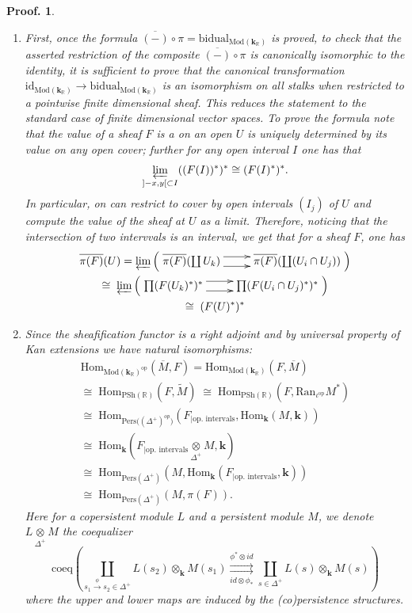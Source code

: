 \documentclass[a4paper, english, 11pt]{article}
\newcommand{\kk}[0]{\textbf{k}}
\newcommand{\Mod}[0]{\text{Mod}}
\newcommand{\Pe}{\text{Pers}}
\newcommand{\0}{\vec{0}}
\newcommand{\R}[0]{\mathbb{R}}
\newcommand{\op}[0]{\text{op}}
\newcommand{\Hom}[0]{\text{Hom}}
\newtheorem*{pf}{Proof.} }
\begin{document}
\begin{pf}
\begin{enumerate}
    \item First, once the formula  $\overline{(-)}\circ \pi =\text{bidual}_{\Mod(\kk_\R)}$ is proved, to check  that the asserted restriction of the composite $\overline{(-)}\circ \pi $ is canonically isomorphic to the identity, it is sufficient  to prove that the canonical transformation $\text{id}_{\Mod(\kk_\R)} \to \text{bidual}_{\Mod(\kk_\R)}$ is an isomorphism on all stalks when restricted to a pointwise finite dimensional sheaf. This reduces the statement to the standard case of finite dimensional vector spaces.  To prove the formula note that the value of a sheaf  $F$ is a  on an open $U$ is uniquely determined by its value on any open cover; further for any open interval $I$ one has that $$\varprojlim_{]-x,y[\subset I} ((F(I))^*)^* \cong (F(I)^*)^*.$$ In particular, on can restrict to cover by open intervals $(I_j)$ of $U$ and compute the value of the sheaf at $U$ as a limit.
   Therefore, noticing that the intersection of two intervvals is an interval, we get that for a sheaf $F$, one has 
   \begin{multline*}\overline{\pi(F)}(U) = \varprojlim \Big(\xymatrix{\overline{\pi(F)}(\coprod U_k) \ar@<1ex>[r] \ar@<-1ex>[r] & \overline{\pi(F)}(\coprod (U_i \cap U_j)) } \Big) \\ 
   \cong \; \varprojlim \Big(\xymatrix{\prod (F(U_k)^*)^* \ar@<1ex>[r] \ar@<-1ex>[r] & \prod(F(U_i \cap U_j)^*)^* } \Big) \\ \cong \; (F(U)^*)^*
   \end{multline*}
   \item Since the sheafification functor is a right adjoint and by universal property of Kan extensions  we have natural isomorphisms:
   \begin{multline*}
  \Hom_{\Mod(\kk_\R)^{\op}}(\overline{M}, F)  = \Hom_{\Mod(\kk_\R)}(F,\overline{M})    \\ \cong \;
  \Hom_{\text{PSh}(\R)}(F, \tilde{M}) \; \cong \; \Hom_{\text{PSh}(\R)}(F, \text{Ran}_{\iota^{\op}} M^*) \\ \cong \; \Hom_{\Pe\big((\Delta^{+})^{ op}\big)}(F_{ | \text{op. intervals} }, \Hom_{\kk}(M, \kk)) \\ \cong \; \Hom_{\kk}(F_{ | \text{op. intervals} }\mathop{\otimes}\limits_{\Delta^+} M, \kk) \\ \cong \; 
  \Hom_{\Pe(\Delta^+)}(M, \Hom_{\kk}(F_{ | \text{op. intervals} }, \kk)) \\ \cong \; 
 \Hom_{\Pe(\Delta^+)}(M, \pi(F)). 
   \end{multline*}
   Here for a copersistent module $L$ and a persistent module $M$, we denote $L\mathop{\otimes}\limits_{\Delta^+} M$ the coequalizer $$\mathrm{coeq}\left(\coprod_{s_1\stackrel{\phi}\to s_2\in \Delta^+}  L(s_2) \otimes_{\kk} M(s_1) \stackrel{\phi^*\otimes id}{\underset{id\otimes \phi_*}{\rightrightarrows}} \coprod_{s\in \Delta^+} L(s)\otimes_{\kk} M(s) \right)$$ where the upper and lower maps are induced by the (co)persistence structures. 
   

\end{enumerate}
\end{pf}
\end{document}
